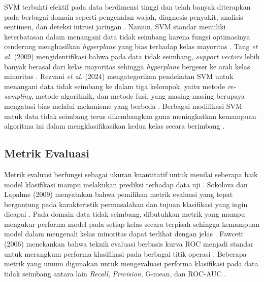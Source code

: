 SVM terbukti efektif pada data berdimensi tinggi dan telah banyak diterapkan pada berbagai domain seperti pengenalan wajah, diagnosis penyakit, analisis sentimen, dan deteksi intrusi jaringan \cite{Abdullah2021SVM}. Namun, SVM standar memiliki keterbatasan dalam menangani data tidak seimbang karena fungsi optimasinya cenderung menghasilkan \textit{hyperplane} yang bias terhadap kelas mayoritas \cite{Tang2009SVMImbalanced, Rezvani2024SVMImbalanced}. Tang \textit{et al.} (2009) mengidentifikasi bahwa pada data tidak seimbang, \textit{support vectors} lebih banyak berasal dari kelas mayoritas sehingga \textit{hyperplane} bergeser ke arah kelas minoritas \cite{Tang2009SVMImbalanced}. Rezvani \textit{et al.} (2024) mengategorikan pendekatan SVM untuk menangani data tidak seimbang ke dalam tiga kelompok, yaitu metode \textit{re-sampling}, metode algoritmik, dan metode fusi, yang masing-masing berupaya mengatasi bias melalui mekanisme yang berbeda \cite{Rezvani2024SVMImbalanced}. Berbagai modifikasi SVM untuk data tidak seimbang terus dikembangkan guna meningkatkan kemampuan algoritma ini dalam mengklasifikasikan kedua kelas secara berimbang \cite{Rezvani2024SVMImbalanced}.


\subsection{Metrik Evaluasi} \label{II.metrik}
Metrik evaluasi berfungsi sebagai ukuran kuantitatif untuk menilai seberapa baik model klasifikasi mampu melakukan prediksi terhadap data uji \cite{Sokolova2009Metrics}. Sokolova dan Lapalme (2009) menyatakan bahwa pemilihan metrik evaluasi yang tepat bergantung pada karakteristik permasalahan dan tujuan klasifikasi yang ingin dicapai \cite{Sokolova2009Metrics}. Pada domain data tidak seimbang, dibutuhkan metrik yang mampu mengukur performa model pada setiap kelas secara terpisah sehingga kemampuan model dalam mengenali kelas minoritas dapat terlihat dengan jelas \cite{Luque2019Metrics}. Fawcett (2006) menekankan bahwa teknik evaluasi berbasis kurva ROC menjadi standar untuk merangkum performa klasifikasi pada berbagai titik operasi \cite{Fawcett2006ROC}. Beberapa metrik yang umum digunakan untuk mengevaluasi performa klasifikasi pada data tidak seimbang antara lain \textit{Recall}, \textit{Precision}, G-mean, dan ROC-AUC \cite{Sokolova2009Metrics, Grandini2020Metrics}.

